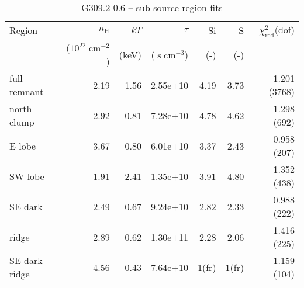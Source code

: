 \documentclass[twocolumn,tighten,trackchanges]{aastex6}
\newcommand*{\mt}{\mathrm}
\newcommand*{\unit}[1]{\;\mt{#1}}  %
\begin{document}
\begin{table*}
    \centering
    \caption{G309.2-0.6 -- sub-source region fits}
    \begin{tabular}{@{}lrrrrrr@{}}
        \toprule
        Region & $n_\mathrm{H}$             & $kT$  & $\tau$                & Si  & S   & $\chi^2_{\mathrm{red}} (\mathrm{dof}$) \\
               & ($10^{22} \unit{cm^{-2}}$) & (keV) & ($\unit{s\;cm^{-3}}$) & (-) & (-) &  \\
        \midrule
        full remnant  & 2.19 & 1.56 & 2.55e+10 &  4.19 & 3.73 & 1.201 (3768) \\
        \midrule
        north clump & 2.92 & 0.81 & 7.28e+10 & 4.78 & 4.62 & 1.298 (692) \\  %
        E lobe & 3.67 & 0.80 & 6.01e+10 & 3.37 & 2.43 & 0.958 (207) \\  %
        SW lobe & 1.91 & 2.41 & 1.35e+10 & 3.91 & 4.80 & 1.352 (438) \\  %
        SE dark & 2.49 & 0.67 & 9.24e+10 & 2.82 & 2.33 & 0.988 (222) \\  %
        \midrule
        ridge & 2.89 & 0.62 & 1.30e+11 & 2.28 & 2.06 & 1.416 (225) \\  %
        SE dark ridge & 4.56 & 0.43 & 7.64e+10 & 1(fr) & 1(fr) & 1.159 (104) \\  %
        \bottomrule
    \end{tabular}
\end{table*}
\end{document}
